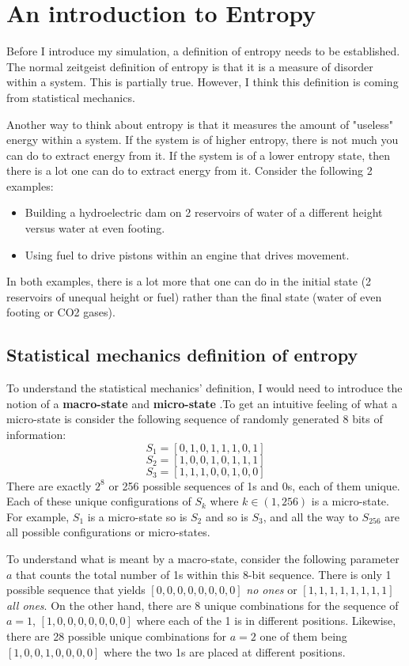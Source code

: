 \section{An introduction to Entropy}
Before I introduce my simulation, a definition of entropy needs to be established. The normal zeitgeist definition of entropy is that it is a measure of disorder within a system. This is partially true. However, I think this definition is coming from statistical mechanics. \par

\vspace{0,3cm}
Another way to think about entropy is that it measures the amount of "useless" energy within a system. If the system is of higher entropy, there is not much you can do to extract energy from it. If the system is of a lower entropy state, then there is a lot one can do to extract energy from it. Consider the following 2 examples:  
\begin{itemize}
    \item Building a hydroelectric dam on 2 reservoirs of water of a different height versus water at even footing. 
    \item Using fuel to drive pistons within an engine that drives movement.
\end{itemize}
In both examples, there is a lot more that one can do in the initial state (2 reservoirs of unequal height or fuel) rather than the final state (water of even footing or CO2 gases).

\subsection{Statistical mechanics definition of entropy}
To understand the statistical mechanics' definition, I would need to introduce the notion of a \textbf{macro-state} and \textbf{micro-state }.To get an intuitive feeling of what a micro-state is consider the following sequence of randomly generated 8 bits of information: 
$$S_{1}=[0,1,0,1,1,1,0,1]$$
$$S_{2}=[1,0,0,1,0,1,1,1]$$
$$S_{3}=[1,1,1,0,0,1,0,0]$$
There are exactly $2^{8}$ or 256 possible sequences of 1s and 0s, each of them unique. Each of these unique configurations of $S_{k}$ where $k \in (1,256)$ is a micro-state. For example, $S_{1}$ is a micro-state so is $S_{2}$ and so is $S_{3}$, and all the way to $S_{256}$ are all possible configurations or micro-states. \par

\vspace{0.3cm}
To understand what is meant by a macro-state, consider the following parameter $a$ that counts the total number of 1s within this 8-bit sequence. There is only 1 possible sequence that yields $[0,0,0,0,0,0,0,0]$ \emph{no ones} or $[1,1,1,1,1,1,1,1]$ \emph{all ones}. On the other hand, there are 8 unique combinations for the sequence of $a=1$, $[1,0,0,0,0,0,0,0]$  where each of the 1 is in different positions. Likewise, there are 28 possible unique combinations for $a=2$ one of them being $[1,0,0,1,0,0,0,0]$ where the two 1s are placed at different positions. \par

